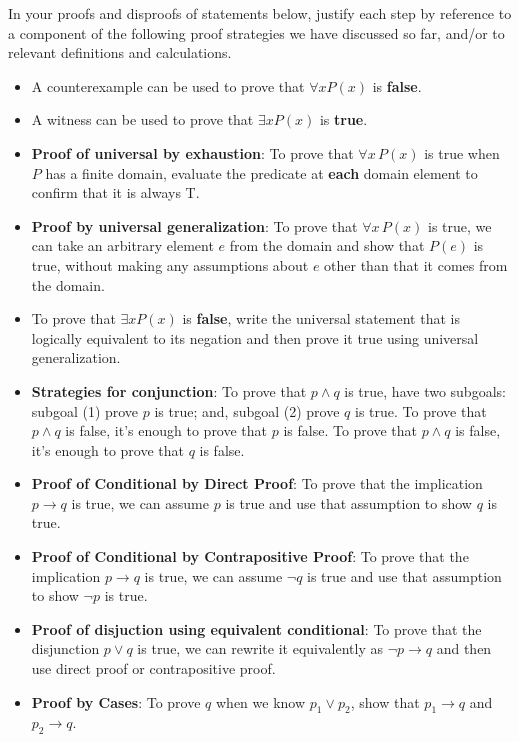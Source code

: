 \documentclass[12pt, oneside]{article}
\begin{document}
\newpage
In your proofs and disproofs of statements below, justify each  step
by reference to  a component of the  following proof  strategies
we  have discussed so far, and/or to relevant definitions and calculations.
\begin{itemize}
    \item A counterexample can be used to prove that  $\forall x P(x)$ is {\bf false}.
    \item  A witness can be used to prove that  $\exists x P(x)$ is {\bf true}.
    \item {\bf Proof of universal by exhaustion}: To prove that $\forall x \, P(x)$
is true when $P$ has a finite domain, evaluate the predicate at {\bf each} domain element to confirm that it is always T.
    \item  {\bf Proof by universal generalization}: To prove that $\forall x \, P(x)$
is true, we can take an arbitrary element $e$ from the domain and show that $P(e)$ is true, without making any assumptions 
about $e$ other than that it comes from the domain.
    \item To  prove  that $\exists x P(x)$ is {\bf false}, write the universal statement that is 
    logically equivalent to its negation and then prove it true using universal generalization.
    \item {\bf Strategies for conjunction}: To prove that $p \land q$ is true, have two subgoals: 
    subgoal (1) prove $p$ 
is  true; and, subgoal (2) prove $q$ is true. To prove that $p \land q$ is false, it's enough to prove that $p$ is false.
 To prove that $p \land q$ is false, it's enough to prove that $q$ is false.
    \item {\bf Proof of Conditional by Direct Proof}: To prove that the implication $p \to q$ is true, 
    we can assume $p$ is true and use that assumption to show $q$ is true.
    \item {\bf Proof of Conditional by Contrapositive Proof}: To prove that the implication $p \to q$ is true, 
    we can assume $\neg q$ is true and use that assumption to show $\neg p$ is true.
    \item {\bf Proof of disjuction using equivalent conditional}: To prove that the 
    disjunction $p \lor q$ is true, we can rewrite it equivalently as $\lnot p \to q$ and
    then use direct proof or contrapositive proof.
    \item {\bf Proof by Cases}: To prove $q$ when we know $p_1 \lor p_2$, show that $p_1 \to q$ and $p_2 \to q$.
\end{itemize}
\end{document}
